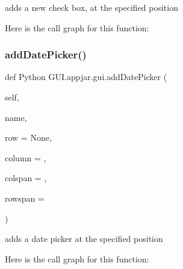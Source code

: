 \begin{DoxyVerb}adds a new check box, at the specified position \end{DoxyVerb}
 Here is the call graph for this function\+:
\mbox{\label{class_python_01_g_u_i_1_1appjar_1_1gui_a4848639278093b1bc6565ba9626f6a26}} 
\subsubsection{\texorpdfstring{add\+Date\+Picker()}{addDatePicker()}}
{\footnotesize\ttfamily def Python G\+U\+I.\+appjar.\+gui.\+add\+Date\+Picker (\begin{DoxyParamCaption}\item[{}]{self,  }\item[{}]{name,  }\item[{}]{row = {\ttfamily None},  }\item[{}]{column = {},  }\item[{}]{colspan = {},  }\item[{}]{rowspan = {} }\end{DoxyParamCaption})}

\begin{DoxyVerb}adds a date picker at the specified position \end{DoxyVerb}
 Here is the call graph for this function\+:
\mbox{\label{class_python_01_g_u_i_1_1appjar_1_1gui_ae958a26820bc6df226990c474cd3e475}} 
